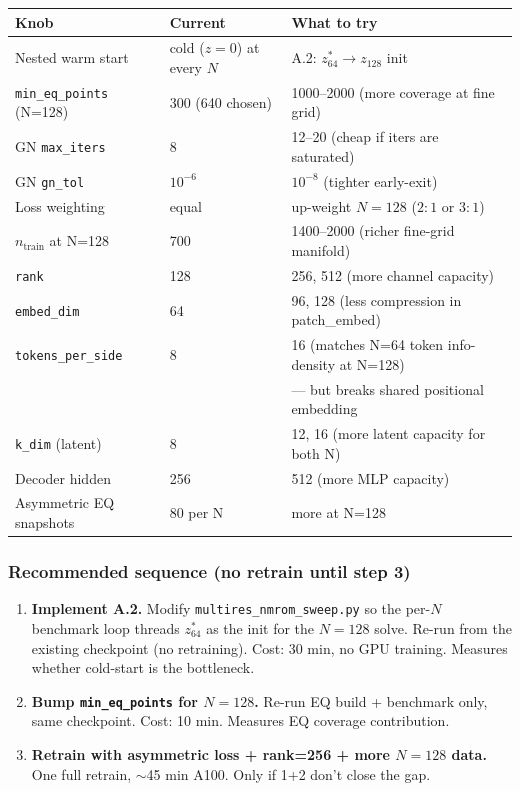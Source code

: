 \begin{center}
\begin{tabular}{l l l}
  \textbf{Knob} & \textbf{Current} & \textbf{What to try} \\
  \hline
  Nested warm start         & cold ($z=0$) at every $N$ & A.2: $z_{64}^\ast \to z_{128}$ init \\
  \texttt{min\_eq\_points} (N=128) & 300 (640 chosen) & 1000--2000 (more coverage at fine grid) \\
  GN \texttt{max\_iters}    & 8                & 12--20 (cheap if iters are saturated) \\
  GN \texttt{gn\_tol}       & $10^{-6}$        & $10^{-8}$ (tighter early-exit) \\
  Loss weighting            & equal            & up-weight $N=128$ ($2:1$ or $3:1$) \\
  $n_\text{train}$ at N=128 & 700              & 1400--2000 (richer fine-grid manifold) \\
  \texttt{rank}             & 128              & 256, 512 (more channel capacity) \\
  \texttt{embed\_dim}       & 64               & 96, 128 (less compression in patch\_embed) \\
  \texttt{tokens\_per\_side}& 8                & 16 (matches N=64 token info-density at N=128)\\
                            &                  & --- but breaks shared positional embedding \\
  \texttt{k\_dim} (latent)  & 8                & 12, 16 (more latent capacity for both N) \\
  Decoder hidden            & 256              & 512 (more MLP capacity) \\
  Asymmetric EQ snapshots   & 80 per N         & more at N=128 \\
\end{tabular}
\end{center}

\subsubsection*{Recommended sequence (no retrain until step 3)}
\begin{enumerate}
  \item \textbf{Implement A.2.} Modify
        \texttt{multires\_nmrom\_sweep.py} so the per-$N$ benchmark loop
        threads $z_{64}^\ast$ as the init for the $N=128$ solve. Re-run from
        the existing checkpoint (no retraining). Cost: 30 min, no GPU
        training. Measures whether cold-start is the bottleneck.
  \item \textbf{Bump \texttt{min\_eq\_points} for $N=128$.} Re-run EQ build +
        benchmark only, same checkpoint. Cost: 10 min. Measures EQ coverage
        contribution.
  \item \textbf{Retrain with asymmetric loss + rank=256 + more $N=128$ data.}
        One full retrain, $\sim$45 min A100. Only if 1+2 don't close the gap.
\end{enumerate}

